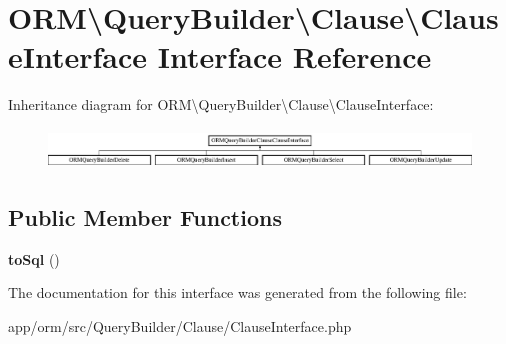 \hypertarget{interfaceORM_1_1QueryBuilder_1_1Clause_1_1ClauseInterface}{}\section{O\+RM\textbackslash{}Query\+Builder\textbackslash{}Clause\textbackslash{}Clause\+Interface Interface Reference}
\label{interfaceORM_1_1QueryBuilder_1_1Clause_1_1ClauseInterface}
Inheritance diagram for O\+RM\textbackslash{}Query\+Builder\textbackslash{}Clause\textbackslash{}Clause\+Interface\+:\begin{figure}[H]
\begin{center}
\leavevmode
\includegraphics[height=1.056604cm]{interfaceORM_1_1QueryBuilder_1_1Clause_1_1ClauseInterface}
\end{center}
\end{figure}
\subsection*{Public Member Functions}
\begin{DoxyCompactItemize}
\item 
{\bfseries to\+Sql} ()\hypertarget{interfaceORM_1_1QueryBuilder_1_1Clause_1_1ClauseInterface_aa0c6ef99a5eb0f0abd951a796fb391c5}{}\label{interfaceORM_1_1QueryBuilder_1_1Clause_1_1ClauseInterface_aa0c6ef99a5eb0f0abd951a796fb391c5}

\end{DoxyCompactItemize}


The documentation for this interface was generated from the following file\+:\begin{DoxyCompactItemize}
\item 
app/orm/src/\+Query\+Builder/\+Clause/Clause\+Interface.\+php\end{DoxyCompactItemize}
